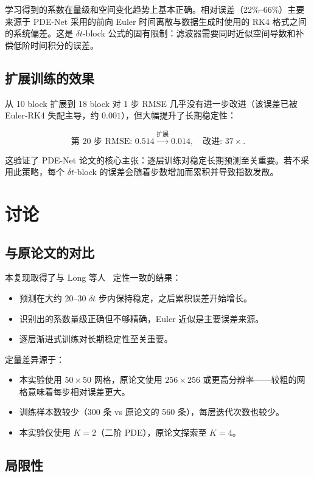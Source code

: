 \documentclass[11pt,a4paper]{article}
\begin{document}
学习得到的系数在量级和空间变化趋势上基本正确。相对误差（22\%--66\%）主要来源于 PDE-Net 采用的前向 Euler 时间离散与数据生成时使用的 RK4 格式之间的系统偏差。这是 $\delta t$-block 公式的固有限制：滤波器需要同时近似空间导数和补偿低阶时间积分的误差。

\subsection{扩展训练的效果}

从 10 block 扩展到 18 block 对 1 步 RMSE 几乎没有进一步改进（该误差已被 Euler-RK4 失配主导，约 $0.001$），但大幅提升了长期稳定性：

\[
\text{第 20 步 RMSE: } 0.514 \xrightarrow{\text{扩展}} 0.014,
\quad \text{改进: } 37\times.
\]

这验证了 PDE-Net 论文的核心主张：逐层训练对稳定长期预测至关重要。若不采用此策略，每个 $\delta t$-block 的误差会随着步数增加而累积并导致指数发散。

\section{讨论}

\subsection{与原论文的对比}

本复现取得了与 Long 等人~\cite{long2018pdenet} 定性一致的结果：

\begin{itemize}
    \item 预测在大约 20--30 $\delta t$ 步内保持稳定，之后累积误差开始增长。
    \item 识别出的系数量级正确但不够精确，Euler 近似是主要误差来源。
    \item 逐层渐进式训练对长期稳定性至关重要。
\end{itemize}

定量差异源于：
\begin{itemize}
    \item 本实验使用 $50\times50$ 网格，原论文使用 $256\times256$ 或更高分辨率——较粗的网格意味着每步相对误差更大。
    \item 训练样本数较少（300 条 vs 原论文的 560 条），每层迭代次数也较少。
    \item 本实验仅使用 $K=2$（二阶 PDE），原论文探索至 $K=4$。
\end{itemize}

\subsection{局限性}
\end{document}
